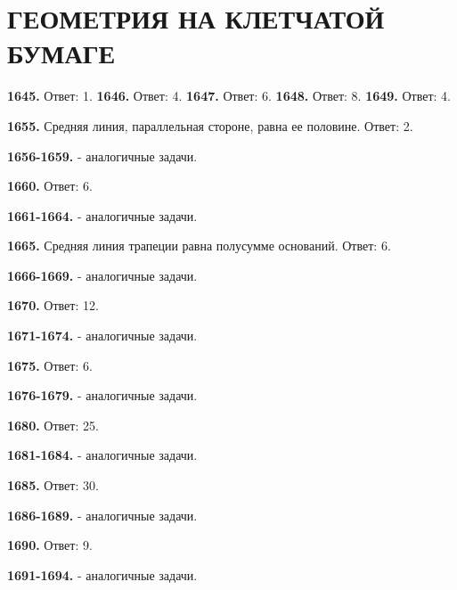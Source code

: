 \section{ГЕОМЕТРИЯ НА КЛЕТЧАТОЙ БУМАГЕ}

\textbf{1645.}  Ответ: 1.  \textbf{1646.}  Ответ: 4. \textbf{1647.}  Ответ: 6.  \textbf{1648.}  Ответ: 8. 
\textbf{1649.}  Ответ: 4.    
  
\textbf{1655.}  Средняя линия, параллельная стороне, равна ее половине.   Ответ: 2. 

\textbf{1656-1659.} - аналогичные задачи. 

\textbf{1660.}  Ответ: 6.   

\textbf{1661-1664.} - аналогичные задачи. 

\textbf{1665.}  Средняя линия трапеции равна полусумме оснований.  \newline Ответ: 6.

\textbf{1666-1669.}  - аналогичные задачи. 

\textbf{1670.}  Ответ: 12.   

\textbf{1671-1674.}  - аналогичные задачи. 

\textbf{1675.}  Ответ: 6.   

\textbf{1676-1679.}  - аналогичные задачи. 

\textbf{1680.}  Ответ: 25.   

\textbf{1681-1684.}  - аналогичные задачи. 

\textbf{1685.}  Ответ: 30.   

\textbf{1686-1689.}  - аналогичные задачи. 

\textbf{1690.}  Ответ: 9.   

\textbf{1691-1694.}  - аналогичные задачи. 